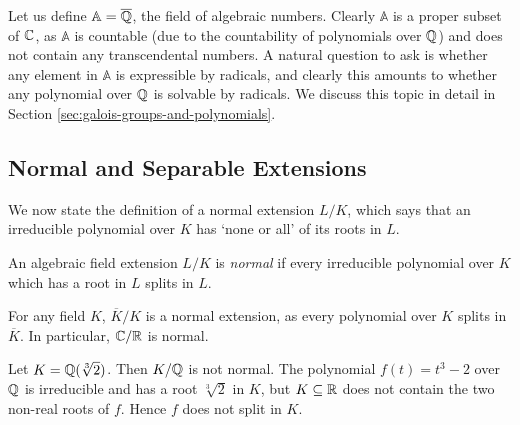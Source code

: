 Let us define $\mathbb A = \overline {\mathbb Q}$, the field of algebraic numbers. Clearly $\mathbb A$ is a proper subset of $\mathbb C$, as $\mathbb A$ is countable (due to the countability of polynomials over $\mathbb Q$) and does not contain any transcendental numbers. A natural question to ask is whether any element in $\mathbb A$ is expressible by radicals, and clearly this amounts to whether any polynomial over $\mathbb Q$ is solvable by radicals. We discuss this topic in detail in Section \ref{sec:galois-groups-and-polynomials}. 

%
%

%



\subsection{Normal and Separable Extensions}

We now state the definition of a normal extension $L/K$, which says that an irreducible polynomial over $K$ has `none or all' of its roots in $L$. 

\begin{definition}
    An algebraic field extension $L/ K$ is \textit{normal} if every irreducible polynomial over $K$ which has a root in $L$ splits in $L$. 
\end{definition}

\begin{example}
	For any field $K$, $\overline K / K$ is a normal extension, as every polynomial over $K$ splits in $\overline K$. In particular, $\mathbb C / \mathbb R$ is normal. 
\end{example}


\begin{example}
    Let $K = \mathbb Q(\sqrt[3]{2})$. Then $K / \mathbb Q$ is not normal. The polynomial $f(t) = t^3 - 2$ over $\mathbb Q$ is irreducible and has a root $\sqrt[3]{2}$ in $K$, but $K \subseteq \mathbb R$ does not contain the two non-real roots of $f$. Hence $f$ does not split in $K$.
\end{example}


